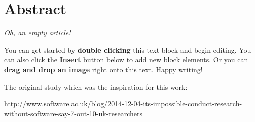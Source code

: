 \section{Abstract}
\textit{Oh, an empty article!} 

You can get started by \textbf{double clicking} this text block and begin editing. You can also click the \textbf{Insert} button below to add new block elements. Or you can \textbf{drag and drop an image} right onto this text. Happy writing!

The original study which was the inspiration for this work:

http://www.software.ac.uk/blog/2014-12-04-its-impossible-conduct-research-without-software-say-7-out-10-uk-researchers